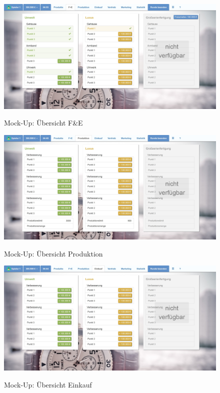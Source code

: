 \begin{figure} 
	\centering
	\includegraphics[scale=0.1]{img/bilder_layout/MockUp3.jpg}
	\label{fig:abb6}
	\caption{Mock-Up: Übersicht F\&E} 
\end{figure}
\begin{figure} 
	\centering
	\includegraphics[scale=0.1]{img/bilder_layout/MockUp4.jpg}
	\label{fig:abb7}
	\caption{Mock-Up: Übersicht Produktion} 
\end{figure}
\begin{figure} 
	\centering
	\includegraphics[scale=0.1]{img/bilder_layout/MockUp6.jpg}
	\label{fig:abb8}
	\caption{Mock-Up: Übersicht Einkauf} 
\end{figure}
